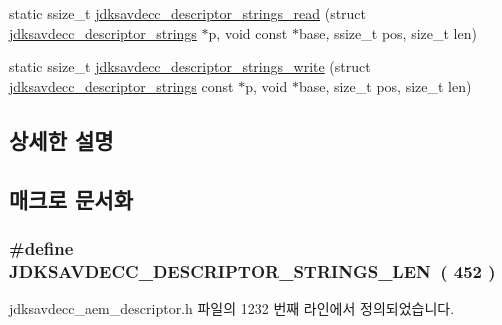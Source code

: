 \begin{DoxyCompactItemize}
\item 
static ssize\+\_\+t \hyperlink{group__descriptor__strings_gaf2d5e1a6f75299299022116349a0dff7}{jdksavdecc\+\_\+descriptor\+\_\+strings\+\_\+read} (struct \hyperlink{structjdksavdecc__descriptor__strings}{jdksavdecc\+\_\+descriptor\+\_\+strings} $\ast$p, void const $\ast$base, ssize\+\_\+t pos, size\+\_\+t len)
\item 
static ssize\+\_\+t \hyperlink{group__descriptor__strings_ga4d6eb9bd6f139a4de2f5383cf911d253}{jdksavdecc\+\_\+descriptor\+\_\+strings\+\_\+write} (struct \hyperlink{structjdksavdecc__descriptor__strings}{jdksavdecc\+\_\+descriptor\+\_\+strings} const $\ast$p, void $\ast$base, size\+\_\+t pos, size\+\_\+t len)
\end{DoxyCompactItemize}


\subsection{상세한 설명}


\subsection{매크로 문서화}
\subsubsection[{\texorpdfstring{J\+D\+K\+S\+A\+V\+D\+E\+C\+C\+\_\+\+D\+E\+S\+C\+R\+I\+P\+T\+O\+R\+\_\+\+S\+T\+R\+I\+N\+G\+S\+\_\+\+L\+EN}{JDKSAVDECC_DESCRIPTOR_STRINGS_LEN}}]{\setlength{\rightskip}{0pt plus 5cm}\#define J\+D\+K\+S\+A\+V\+D\+E\+C\+C\+\_\+\+D\+E\+S\+C\+R\+I\+P\+T\+O\+R\+\_\+\+S\+T\+R\+I\+N\+G\+S\+\_\+\+L\+EN~( 452 )}\hypertarget{group__descriptor__strings_ga1a0c88a9f0306c420ea4d28e147f400e}{}\label{group__descriptor__strings_ga1a0c88a9f0306c420ea4d28e147f400e}


jdksavdecc\+\_\+aem\+\_\+descriptor.\+h 파일의 1232 번째 라인에서 정의되었습니다.


